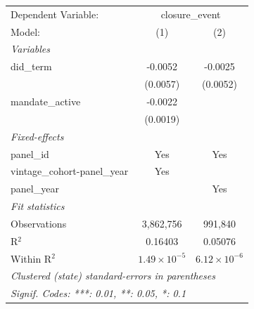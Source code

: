 
\begingroup
\centering
\begin{tabular}{lcc}
   \tabularnewline \midrule \midrule
   Dependent Variable: & \multicolumn{2}{c}{closure\_event}\\
   Model:                        & (1)                   & (2)\\  
   \midrule
   \emph{Variables}\\
   did\_term                     & -0.0052               & -0.0025\\   
                                 & (0.0057)              & (0.0052)\\   
   mandate\_active               & -0.0022               &   \\   
                                 & (0.0019)              &   \\   
   \midrule
   \emph{Fixed-effects}\\
   panel\_id                     & Yes                   & Yes\\  
   vintage\_cohort-panel\_year   & Yes                   & \\  
   panel\_year                   &                       & Yes\\  
   \midrule
   \emph{Fit statistics}\\
   Observations                  & 3,862,756             & 991,840\\  
   R$^2$                         & 0.16403               & 0.05076\\  
   Within R$^2$                  & $1.49\times 10^{-5}$  & $6.12\times 10^{-6}$\\   
   \midrule \midrule
   \multicolumn{3}{l}{\emph{Clustered (state) standard-errors in parentheses}}\\
   \multicolumn{3}{l}{\emph{Signif. Codes: ***: 0.01, **: 0.05, *: 0.1}}\\
\end{tabular}
\par\endgroup


